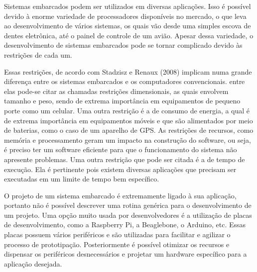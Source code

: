 Sistemas embarcados podem ser utilizados em diversas aplicações. Isso é possível devido à enorme variedade de processadores disponíveis no mercado, o que leva ao desenvolvimento de vários sistemas, os quais vão desde uma simples escova de dentes eletrônica, até o painel de controle de um avião. Apesar dessa variedade, o desenvolvimento de sistemas embarcados pode se tornar complicado devido às restrições de cada um. 

Essas restrições, de acordo com Stadzisz e Renaux (2008) implicam numa grande diferença entre os sistemas embarcados e os computadores convencionais. entre elas pode-se citar as chamadas restrições dimensionais, as quais envolvem tamanho e peso, sendo de extrema importância em equipamentos de pequeno porte como um celular. Uma outra restrição é a de consumo de energia, a qual é de extrema importância em equipamentos móveis e que são alimentados por meio de baterias, como o caso de um aparelho de GPS. As restrições de recursos, como memória e processamento geram um impacto na construção do software, ou seja, é preciso ter um software eficiente para que o funcionamento do sistema não apresente problemas. Uma outra restrição que pode ser citada é a de tempo de execução. Ela é pertinente pois existem diversas aplicações que precisam ser executadas em um limite de tempo bem específico.

O projeto de um sistema embarcado é extremamente ligado à sua aplicação, portanto não é possível descrever uma rotina genérica para o desenvolvimento de um projeto. Uma opção muito usada por desenvolvedores é a utilização de placas de desenvolvimento, como a Raspberry Pi, a Beaglebone, o Arduino, etc. Essas placas possuem vários periféricos e são utilizadas para facilitar e agilizar o processo de prototipação. Posteriormente é possível otimizar
os recursos e dispensar os periféricos desnecessários e projetar um hardware específico para a aplicação desejada.